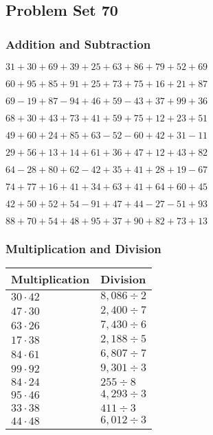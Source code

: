 \hypertarget{problem-set-70}{%
\subsection{Problem Set 70}\label{problem-set-70}}

\hypertarget{addition-and-subtraction}{%
\subsubsection{Addition and
Subtraction}\label{addition-and-subtraction}}

\(31+30+69+39+25+63+86+79+52+69\)

\(60+95+85+91+25+73+75+16+21+87\)

\(69-19+87-94+46+59-43+37+99+36\)

\(68+30+43+73+41+59+75+12+23+51\)

\(49+60+24+85+63-52-60+42+31-11\)

\(29+56+13+14+61+36+47+12+43+82\)

\(64-28+80+62-42+35+41+28+19-67\)

\(74+77+16+41+34+63+41+64+60+45\)

\(42+50+52+54-91+47+44-27-51+93\)

\(88+70+54+48+95+37+90+82+73+13\)

\hypertarget{multiplication-and-division}{%
\subsubsection{Multiplication and
Division}\label{multiplication-and-division}}

\begin{longtable}[]{@{}ll@{}}
\toprule
Multiplication & Division\tabularnewline
\midrule
\endhead
\(30\cdot42\) & \(8,086÷2\)\tabularnewline
\(47\cdot30\) & \(2,400÷7\)\tabularnewline
\(63\cdot26\) & \(7,430÷6\)\tabularnewline
\(17\cdot38\) & \(2,188÷5\)\tabularnewline
\(84\cdot61\) & \(6,807÷7\)\tabularnewline
\(99\cdot92\) & \(9,301÷3\)\tabularnewline
\(84\cdot24\) & \(255÷8\)\tabularnewline
\(95\cdot46\) & \(4,293÷3\)\tabularnewline
\(33\cdot38\) & \(411÷3\)\tabularnewline
\(44\cdot48\) & \(6,012÷3\)\tabularnewline
\bottomrule
\end{longtable}
